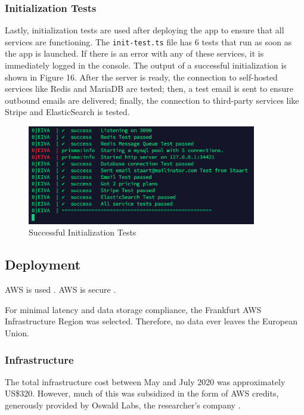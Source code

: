 \documentclass{article}
\begin{document}
\subsubsection{Initialization Tests}

Lastly, initialization tests are used after deploying the app to ensure that all services are functioning. The \texttt{init-test.ts} file has 6 tests that run as soon as the app is launched. If there is an error with any of these services, it is immediately logged in the console. The output of a successful initialization is shown in Figure 16. After the server is ready, the connection to self-hosted services like Redis and MariaDB are tested; then, a test email is sent to ensure outbound emails are delivered; finally, the connection to third-party services like Stripe and ElasticSearch is tested.

\begin{figure}
	\center
	\includegraphics[width=10cm]{init-tests.png}
	\caption{Successful Initialization Tests}
\end{figure}

\subsection{Deployment}

AWS is used \cite{shokeen_deploying_2019}. AWS is secure \cite{narula_cloud_2015}.

For minimal latency and data storage compliance, the Frankfurt AWS Infrastructure Region was selected. Therefore, no data ever leaves the European Union.

\subsubsection{Infrastructure}

The total infrastructure cost between May and July 2020 was approximately US\$320. However, much of this was subsidized in the form of AWS credits, generously provided by Oswald Labs, the researcher's company \cite{noauthor_oswald_nodate}.
\end{document}
